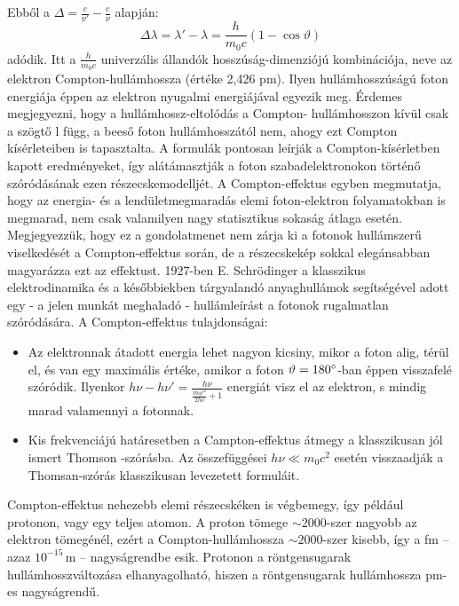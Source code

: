 \documentclass[../main.tex]{subfiles}
\begin{document}
Ebből a $\Delta = \frac{c}{\nu'} - \frac{c}{\nu}$ alapján:
\begin{equation}
    \Delta \lambda = \lambda' - \lambda = \frac{h}{m_0 c} (1 - \cos \vartheta)
\end{equation}
adódik. Itt a $\frac{h}{m_0 c}$ univerzális állandók hosszúság-dimenziójú kombinációja, neve az elektron Compton-hullámhossza (értéke 2,426 pm). 
Ilyen hullámhosszúságú foton energiája éppen az elektron nyugalmi energiájával egyezik meg. Érdemes megjegyezni, hogy a hullámhossz-eltolódás a Compton-
hullámhosszon kívül csak a szögtő l függ, a beeső foton hullámhosszától nem, ahogy ezt Compton kísérleteiben is tapasztalta.
A formulák pontosan leírják a Compton-kísérletben kapott eredményeket, így alátámasztják a foton szabadelektronokon történő szóródásának ezen részecskemodelljét.
A Compton-effektus egyben megmutatja, hogy az energia- és a lendületmegmaradás elemi foton-elektron folyamatokban is megmarad, nem csak valamilyen nagy statisztikus sokaság átlaga esetén. Megjegyezzük,
hogy ez a gondolatmenet nem zárja ki a fotonok hullámszerű viselkedését a Compton-effektus során, de a részecskekép sokkal elegánsabban magyarázza
ezt az effektust. 1927-ben E. Schrödinger a klasszikus elektrodinamika és a későbbiekben tárgyalandó anyaghullámok segítségével adott egy - a jelen munkát meghaladó - hullámleírást a fotonok rugalmatlan szóródására.
A Compton-effektus tulajdonságai:
\begin{itemize}
    \item Az elektronnak átadott energia lehet nagyon kicsiny, mikor a foton alig, térül el, és van egy maximális értéke, amikor a foton $\vartheta = 180\degree$-ban éppen visszafelé szóródik. Ilyenkor $h \nu - h \nu' = \frac{h \nu}{\frac{m_0 c^2}{2 h \nu} + 1}$ energiát visz el az elektron, s mindig marad valamennyi a fotonnak.
    \item Kis frekvenciájú határesetben a Campton-effektus átmegy a klasszikusan jól ismert Thomson -szórásba. Az összefüggései $h \nu \ll m_0 c^2$ esetén visszaadják a Thomsan-szórás klasszikusan levezetett formuláit.
\end{itemize}
Compton-effektus nehezebb elemi részecskéken is végbemegy, így például protonon, vagy egy teljes atomon. A proton tömege $\sim 2000$-szer nagyobb az elektron tömegénél, ezért a Compton-hullámhossza $\sim 2000$-szer kisebb, így a fm – azaz $10^{-15}\,\mathrm{m}$ – nagyságrendbe esik. Protonon a röntgensugarak hullámhosszváltozása elhanyagolható, hiszen a röntgensugarak hullámhossza pm-es nagyságrendű.
\end{document}
